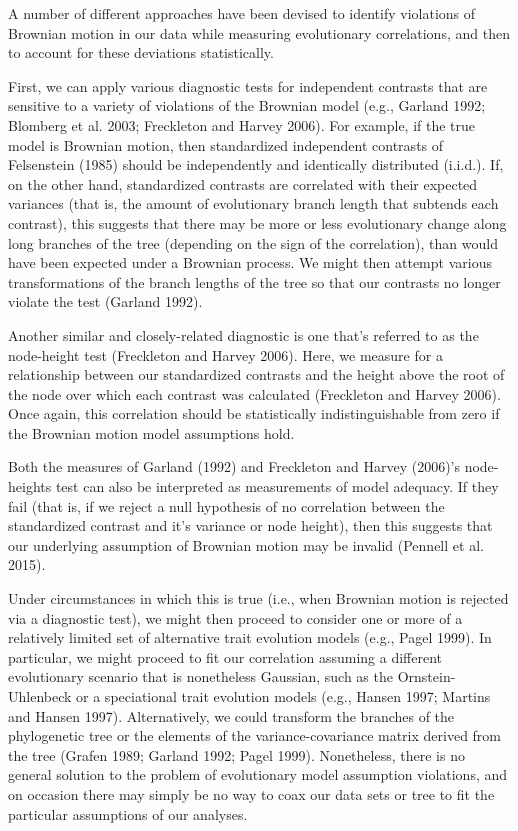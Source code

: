 \documentclass[fleqn,10pt,lineno]{wlpeerj} %
\begin{document}
A number of different approaches have been devised to identify violations of Brownian motion in our data while measuring evolutionary correlations, and then to account for these deviations statistically.

First, we can apply various diagnostic tests for independent contrasts that are sensitive to a variety of violations of the Brownian model (e.g., Garland 1992; Blomberg et al. 2003; Freckleton and Harvey 2006). For example, if the true model is Brownian motion, then standardized independent contrasts of Felsenstein (1985) should be independently and identically distributed (i.i.d.). If, on the other hand, standardized contrasts are correlated with their expected variances (that is, the amount of evolutionary branch length that subtends each contrast), this suggests that there may be more or less evolutionary change along long branches of the tree (depending on the sign of the correlation), than would have been expected under a Brownian process. We might then attempt various transformations of the branch lengths of the tree so that our contrasts no longer violate the test (Garland 1992).

Another similar and closely-related diagnostic is one that's referred to as the node-height test (Freckleton and Harvey 2006). Here, we measure for a relationship between our standardized contrasts and the height above the root of the node over which each contrast was calculated (Freckleton and Harvey 2006). Once again, this correlation should be statistically indistinguishable from zero if the Brownian motion model assumptions hold.

Both the measures of Garland (1992) and Freckleton and Harvey (2006)'s node-heights test can also be interpreted as measurements of model adequacy. If they fail (that is, if we reject a null hypothesis of no correlation between the standardized contrast and it's variance or node height), then this suggests that our underlying assumption of Brownian motion may be invalid (Pennell et al. 2015).

Under circumstances in which this is true (i.e., when Brownian motion is rejected via a diagnostic test), we might then proceed to consider one or more of a relatively limited set of alternative trait evolution models (e.g., Pagel 1999). In particular, we might proceed to fit our correlation assuming a different evolutionary scenario that is nonetheless Gaussian, such as the Ornstein-Uhlenbeck or a speciational trait evolution models (e.g., Hansen 1997; Martins and Hansen 1997). Alternatively, we could transform the branches of the phylogenetic tree or the elements of the variance-covariance matrix derived from the tree (Grafen 1989; Garland 1992; Pagel 1999). Nonetheless, there is no general solution to the problem of evolutionary model assumption violations, and on occasion there may simply be no way to coax our data sets or tree to fit the particular assumptions of our analyses.
\end{document}
